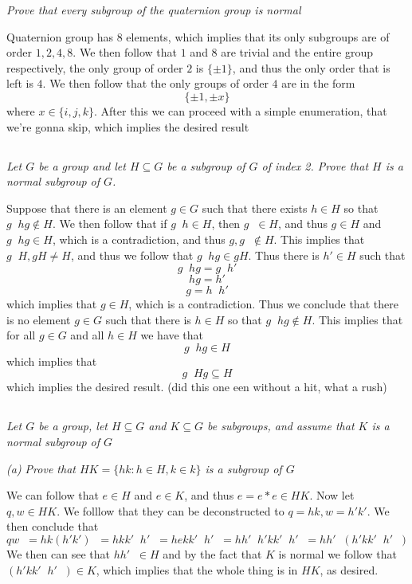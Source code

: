\documentclass[11pt,oneside,titlepage]{book}
\DeclareMathOperator \inv {^{-1}}
\newcommand{\set}[1]{\{ #1 \}}
\begin{document}
\textit{Prove that every subgroup of the quaternion group is normal}

Quaternion group has $8$ elements, which implies that its only
subgroups are of order $1, 2, 4, 8$. We then follow that $1$ and $8$
are trivial and the entire group respectively, the only group of order
$2$ is $\set{\pm 1}$, and thus the only order that is left is $4$.  We
then follow that the only groups of order $4$ are in the form
$$\set{\pm 1, \pm x}$$
where $x \in \set{i, j, k}$. After this we can proceed with a simple
enumeration, that we're gonna skip, which implies the desired result

\subsection{}

\textit{Let $G$ be a group and let $H \subseteq G$ be a subgroup of
  $G$ of index 2.  Prove that $H$ is a normal subgroup of $G$.}

Suppose that there is an element $g \in G$ such that there exists $h
\in H$ so that $g\inv h g \notin H$. We then follow that if
$g\inv h \in H$, then $g\inv \in H$, and thus $g \in H$
and $g\inv h g \in H$, which is a contradiction, and thus
$g, g\inv \notin H$. This implies that $g\inv H, g H \neq H$,
and thus we follow that $g\inv h g \in gH$. Thus
there is $h' \in H$ such that
$$g\inv h g = g\inv h'$$
$$h g = h'$$
$$g = h\inv h'$$
which implies that $g \in H$, which is a contradiction. Thus
we conclude that there is no element $g \in G$ such that
there is $h \in H$ so that $g\inv h g \notin H$. This implies that
for all $g \in G$ and all $h \in H$ we have that 
$$g\inv h g \in H$$
which implies that
$$g\inv H g \subseteq H$$
which implies the desired result. (did this one een without a hit,
what a rush)

\subsection{}

\textit{Let $G$ be a group, let $H \subseteq G$ and $K \subseteq G$
  be subgroups, and assume that $K$ is a normal subgroup of $G$}

\textit{(a) Prove that $HK = \set{hk: h \in H, k \in k}$ is a subgroup of $G$}

We can follow that $e \in H$ and $e \in K$, and thus $e = e * e \in HK$.
Now let $q, w \in HK$. We folllow that they can be deconstructed to
$q = hk, w = h' k'$. We then conclude that 
$$q w\inv  = hk (h' k')\inv = h k k' \inv h'\inv = h e k k'\inv h'\inv  =
h h'\inv h' k k'\inv h'\inv = h h'\inv (h' k k'\inv h'\inv)$$
We then can see that $h h'\inv \in H$ and by the fact that $K$ is normal
we follow that $(h' k k'\inv h'\inv) \in K$, which implies that the whole thing
is in $HK$, as desired.
\end{document}
